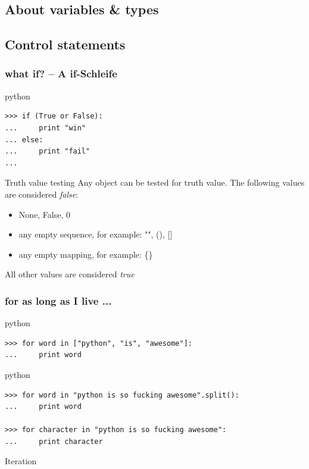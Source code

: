 \documentclass{beamer}
\begin{document}
\subsection{About variables \& types}

\subsection{Control statements}
\begin{frame}[fragile]
    \frametitle{what if? -- A if-Schleife}
    
    \begin{exampleblock}{python}
    \begin{lstlisting}
>>> if (True or False):
...     print "win"
... else:
...     print "fail"
...
    \end{lstlisting}
    \end{exampleblock}

    \begin{block}{Truth value testing}
    Any object can be tested for truth value. The following values are considered \emph{false}:
    \begin{itemize}
        \item None, False, 0
        \item any empty sequence, for example: "", (), []
        \item any empty mapping, for example: \{\}
    \end{itemize}
    All other values are considered \emph{true}
    \end{block}
\end{frame}

\begin{frame}[fragile]
    \frametitle{for as long as I live ...}
    
    \begin{exampleblock}{python}
    \begin{lstlisting}
>>> for word in ["python", "is", "awesome"]:
...     print word
    \end{lstlisting}
    \end{exampleblock}

    \begin{exampleblock}{python}
    \begin{lstlisting}
>>> for word in "python is so fucking awesome".split():
...     print word

>>> for character in "python is so fucking awesome":
...     print character
    \end{lstlisting}
    \end{exampleblock}

    \begin{block}{Iteration}
    \end{block}
\end{frame}
\end{document}
